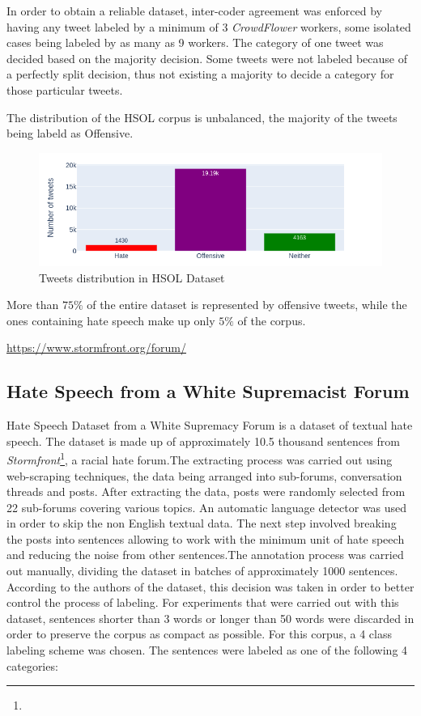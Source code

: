 \documentclass[12pt,a4paper]{report}
\begin{document}
In order to obtain a reliable dataset, inter-coder agreement was enforced by having any tweet labeled by a minimum of 3 \textit{CrowdFlower} workers, some isolated cases being labeled by as many as 9 workers. The category of one tweet was decided based on the majority decision. Some tweets were not labeled because of a perfectly split decision, thus not existing a majority to decide a category for those particular tweets.

The distribution of the HSOL corpus is unbalanced, the majority of the tweets being labeld as Offensive.

\begin{figure}[H]
\centering
\includegraphics[width=18cm]{pics/HSOL.png}
  \caption{Tweets distribution in HSOL Dataset}
  \label{fig:HSOL}
\end{figure}

More than $75\%$ of the entire dataset is represented by offensive tweets, while the ones containing hate speech make up only $5\%$ of the corpus.

\urldef{\urlStormfront}\url{https://www.stormfront.org/forum/}
\subsection{Hate Speech from a White Supremacist Forum}
Hate Speech Dataset from a White Supremacy Forum \citep{de2018hate} is a dataset of textual hate speech. The dataset is made up of approximately 10.5 thousand sentences from \textit{Stormfront}\footnote{\urlStormfront}, a racial hate forum.The extracting process was carried out using web-scraping techniques, the data being arranged into sub-forums, conversation threads and posts. After extracting the data, posts were randomly selected from 22 sub-forums covering various topics. An automatic language detector was used in order to skip the non English textual data. The next step involved breaking the posts into sentences allowing to work with the minimum unit of hate speech and reducing the noise from other sentences.The annotation process was carried out manually, dividing the dataset in batches of approximately 1000 sentences. According to the authors of the dataset, this decision was taken in order to better control the process of labeling. For experiments that were carried out with this dataset, sentences shorter than 3 words or longer than 50 words were discarded in order to preserve the corpus as compact as possible. For this corpus, a 4 class labeling scheme was chosen. The sentences were labeled as one of the following 4 categories:
\end{document}
